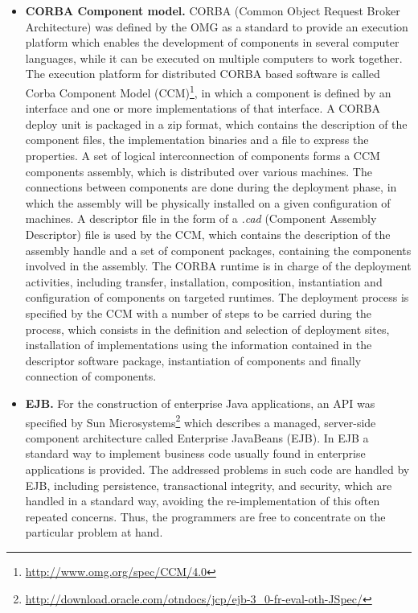 \begin{itemize}
	\item \textbf{CORBA Component model.}
	CORBA (Common Object Request Broker Architecture) was defined by the OMG as a standard to provide an execution platform which enables the development of components in several computer languages, while it can be executed on multiple computers to work together.
	The execution platform for distributed CORBA based software is called Corba Component Model (CCM)\footnote{\url{http://www.omg.org/spec/CCM/4.0}}, in which a component is defined by an interface and one or more implementations of that interface.
	A CORBA deploy unit is packaged in a zip format, which contains the description of the component files, the implementation binaries and a file to express the properties.
	A set of logical interconnection of components forms a CCM components assembly, which is distributed over various machines.
	The connections between components are done during the deployment phase, in which the assembly will be physically installed on a given configuration of machines.
	A descriptor file in the form of a \textit{.cad} (Component Assembly Descriptor) file is used by the CCM, which contains the description of the assembly handle and a set of component packages, containing the components involved in the assembly.
	The CORBA runtime is in charge of the deployment activities, including transfer, installation, composition, instantiation and configuration of components on targeted runtimes.
	The deployment process is specified by the CCM with a number of steps to be carried during the process, which consists in the definition and selection of deployment sites, installation of implementations using the information contained in the descriptor software package, instantiation of components and finally connection of components.
	
	\item \textbf{EJB.}
	For the construction of enterprise Java applications, an API was specified by Sun Microsystems\footnote{\url{http://download.oracle.com/otndocs/jcp/ejb-3_0-fr-eval-oth-JSpec/}} which describes a managed, server-side component architecture called Enterprise JavaBeans (EJB).
	In EJB a standard way to implement business code usually found in enterprise applications is provided.
	The addressed problems in such code are handled by EJB, including persistence, transactional integrity, and security, which are handled in a standard way, avoiding the re-implementation of this often repeated concerns.
	Thus, the programmers are free to concentrate on the particular problem at hand.
	

\end{itemize}

